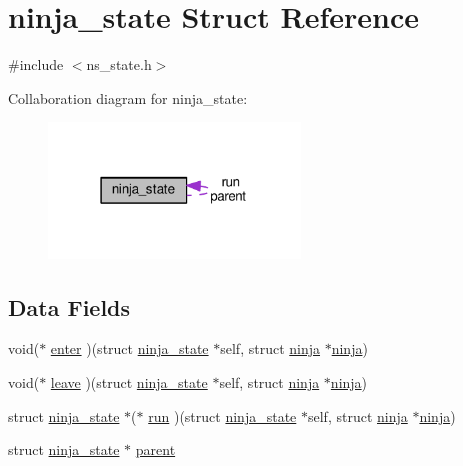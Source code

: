 \hypertarget{structninja__state}{\section{ninja\+\_\+state Struct Reference}
\label{structninja__state}
}


{\ttfamily \#include $<$ns\+\_\+state.\+h$>$}



Collaboration diagram for ninja\+\_\+state\+:\nopagebreak
\begin{figure}[H]
\begin{center}
\leavevmode
\includegraphics[width=190pt]{structninja__state__coll__graph}
\end{center}
\end{figure}
\subsection*{Data Fields}
\begin{DoxyCompactItemize}
\item 
void($\ast$ \hyperlink{structninja__state_aac109f61704e26f5116501e390a2183f}{enter} )(struct \hyperlink{structninja__state}{ninja\+\_\+state} $\ast$self, struct \hyperlink{structninja}{ninja} $\ast$\hyperlink{structninja}{ninja})
\item 
void($\ast$ \hyperlink{structninja__state_ac95b7def4cb35156771cafdece50668f}{leave} )(struct \hyperlink{structninja__state}{ninja\+\_\+state} $\ast$self, struct \hyperlink{structninja}{ninja} $\ast$\hyperlink{structninja}{ninja})
\item 
struct \hyperlink{structninja__state}{ninja\+\_\+state} $\ast$($\ast$ \hyperlink{structninja__state_a7cbd1ccaddd06c7efb10c197040524f3}{run} )(struct \hyperlink{structninja__state}{ninja\+\_\+state} $\ast$self, struct \hyperlink{structninja}{ninja} $\ast$\hyperlink{structninja}{ninja})
\item 
struct \hyperlink{structninja__state}{ninja\+\_\+state} $\ast$ \hyperlink{structninja__state_a291d892af65699495e91f52b10c9c28c}{parent}
\end{DoxyCompactItemize}


